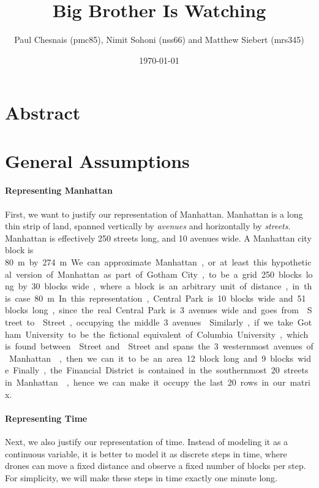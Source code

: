 \documentclass{article}
\title{Big Brother Is Watching}
\author{Paul Chesnais (pmc85), Nimit Sohoni (nss66) and Matthew Siebert (mrs345)}
\date{\today}
\begin{document}
\maketitle
\thispagestyle{empty}

\section{Abstract}
\label{sec:abstract}


\section{General Assumptions}
\label{sec:general_assumptions}
\paragraph{Representing Manhattan}
\label{par:representing_manhattan}
First, we want to justify our representation of Manhattan. Manhattan is a long thin strip of land, spanned vertically by \emph{avenues} and horizontally by \emph{streets}. Manhattan is effectively 250 streets long, and 10 avenues wide. A Manhattan city block is \SI{80}\m by \SI{274}\m. We can approximate Manhattan, or at least this hypothetical version of Manhattan as part of Gotham City, to be a grid 250 blocks long by 30 blocks wide, where a block is an arbitrary unit of distance, in this case \SI{80}\m. In this representation, Central Park is 10 blocks wide and 51 blocks long, since the real Central Park is 3 avenues wide and goes from  Street to  Street, occupying the middle 3 avenues \cite{centralpark}. Similarly, if we take Gotham University to be the fictional equivalent of Columbia University, which is found between  Street and  Street and spans the 3 westernmost avenues of Manhattan \cite{columbia}, then we can it to be an area 12 block long and 9 blocks wide. Finally, the Financial District is contained in the southernmost 20 streets in Manhattan \cite{financial}, hence we can make it occupy the last 20 rows in our matrix.

\paragraph{Representing Time}
\label{par:representing_time}
Next, we also justify our representation of time. Instead of modeling it as a continuous variable, it is better to model it as discrete steps in time, where drones can move a fixed distance and observe a fixed number of blocks per step. For simplicity, we will make these steps in time exactly one minute long.
\end{document}
